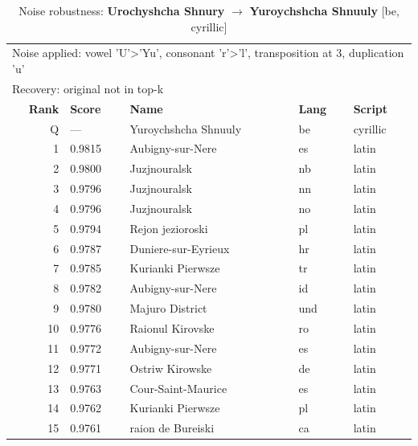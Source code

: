 \begin{table}[htbp]
\centering
\small
\caption{Noise robustness: \textbf{Urochyshcha Shnury} $\rightarrow$ \textbf{Yuroychshcha Shnuuly} [be, cyrillic]}
\label{tab:noise-14}
\begin{tabular}{rllll}
\toprule
\multicolumn{5}{l}{\small Noise applied: vowel 'U'>'Yu', consonant 'r'>'l', transposition at 3, duplication 'u'} \\
\multicolumn{5}{l}{\small Recovery: original not in top-k} \\
\midrule
\textbf{Rank} & \textbf{Score} & \textbf{Name} & \textbf{Lang} & \textbf{Script} \\
\midrule
\rowcolor{gray!20} Q & --- & Yuroychshcha Shnuuly & be & cyrillic \\
\midrule
1 & 0.9815 & Aubigny-sur-Nere & es & latin \\
2 & 0.9800 & Juzjnouralsk & nb & latin \\
3 & 0.9796 & Juzjnouralsk & nn & latin \\
4 & 0.9796 & Juzjnouralsk & no & latin \\
5 & 0.9794 & Rejon jezioroski & pl & latin \\
6 & 0.9787 & Duniere-sur-Eyrieux & hr & latin \\
7 & 0.9785 & Kurianki Pierwsze & tr & latin \\
8 & 0.9782 & Aubigny-sur-Nere & id & latin \\
9 & 0.9780 & Majuro District & und & latin \\
10 & 0.9776 & Raionul Kirovske & ro & latin \\
11 & 0.9772 & Aubigny-sur-Nere & es & latin \\
12 & 0.9771 & Ostriw Kirowske & de & latin \\
13 & 0.9763 & Cour-Saint-Maurice & es & latin \\
14 & 0.9762 & Kurianki Pierwsze & pl & latin \\
15 & 0.9761 & raion de Bureiski & ca & latin \\
\bottomrule
\end{tabular}
\end{table}


